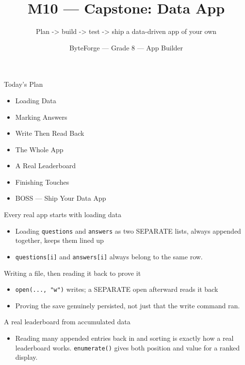 \documentclass[aspectratio=169]{beamer}
\title{M10 — Capstone: Data App}
\subtitle{Plan -> build -> test -> ship a data-driven app of your own}
\author{ByteForge --- Grade 8 --- App Builder}
\date{}
\begin{document}
\begin{frame}
    \titlepage
\end{frame}

\begin{frame}{Today's Plan}
    \begin{itemize}
        \item Loading Data
        \item Marking Answers
        \item Write Then Read Back
        \item The Whole App
        \item A Real Leaderboard
        \item Finishing Touches
        \item[$\bigstar$] BOSS --- Ship Your Data App
    \end{itemize}
\end{frame}

\begin{frame}{Every real app starts with loading data}
    \large
    \begin{itemize}
        \item Loading \texttt{questions} and \texttt{answers} as two SEPARATE lists, always appended together, keeps them lined up
        \item \texttt{questions[i]} and \texttt{answers[i]} always belong to the same row.
    \end{itemize}
\end{frame}


\begin{frame}{Writing a file, then reading it back to prove it}
    \large
    \begin{itemize}
        \item \texttt{open(..., "w")} writes; a SEPARATE open afterward reads it back
        \item Proving the save genuinely persisted, not just that the write command ran.
    \end{itemize}
\end{frame}


\begin{frame}{A real leaderboard from accumulated data}
    \large
    \begin{itemize}
        \item Reading many appended entries back in and sorting is exactly how a real leaderboard works. \texttt{enumerate()} gives both position and value for a ranked display.
    \end{itemize}
\end{frame}
\end{document}
